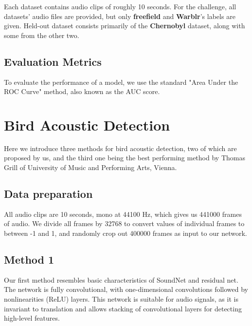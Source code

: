 \documentclass[10pt,twocolumn,letterpaper]{article}
\begin{document}
Each dataset contains audio clips of roughly 10 seconds. For the challenge,
all datasets' audio files are provided, but only \textbf{freefield} and
\textbf{Warblr}'s labels are given. Held-out dataset consists primarily of
the \textbf{Chernobyl} dataset, along with some from the other two.

\subsection{Evaluation Metrics}

To evaluate the performance of a model, we use the standard "Area Under the
ROC Curve" method, also known as the AUC score.

\section{Bird Acoustic Detection}

Here we introduce three methods for bird acoustic detection, two of which
are proposed by us, and the third one being the best performing method by
Thomas Grill of University of Music and Performing Arts, Vienna. 

\subsection{Data preparation}

All audio clips are 10 seconds, mono at 44100 Hz, which gives us 441000
frames of audio. We divide all frames by 32768 to convert values of
individual frames to between -1 and 1, and randomly crop out 400000 frames
as input to our network.

\subsection{Method 1}

Our first method resembles basic characteristics of SoundNet and residual
net. The network is fully convolutional, with one-dimensional convolutions
followed by nonlinearities (ReLU) layers. This network is suitable for
audio signals, as it is invariant to translation and allows stacking of
convolutional layers for detecting high-level features.
\end{document}
